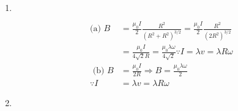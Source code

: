 \begin{enumerate}
\begin{answer}
\begin{figure}[H]
		\end{figure}
		\begin{align*}
		\because B&=\frac{\mu_{0} I}{4 \pi r}\left(\sin \theta_{2}-\sin \theta_{1}\right)\\
		\text{where }\theta_{1}&=-\frac{\phi}{2}\text{ and }\theta_{2}=\frac{\phi}{2}
	\intertext{	Magnetic field due to segment 1 and 3 is}
		B_{1}&=B_{3}=\frac{\mu_{0} I}{4 \pi(d / 2) \cos \frac{\phi}{2}}\left(\sin \frac{\phi}{2}+\sin \frac{\phi}{2}\right)
	\intertext{	Magnetic field due to segment 2 and 4 is}
		B_{2}&=B_{4}=\frac{\mu_{0} I}{4 \pi(d / 2) \sin \frac{\phi}{2}}\left(\cos \frac{\phi}{2}+\cos \frac{\phi}{2}\right)
	\intertext{	Hence, the magnitude of total magnetic field is}
		B&=B_{1}+B_{2}+B_{3}+B_{4}=\frac{2 \mu_{0} I}{4 \pi(d / 2) \sin \frac{\phi}{2}}\left(\cos \frac{\phi}{2}+\cos \frac{\phi}{2}\right)+\frac{2 \mu_{0} I}{4 \pi(d / 2) \cos \frac{\phi}{2}}\left(\sin \frac{\phi}{2}+\sin \frac{\phi}{2}\right) \\
		B&=\frac{2 \mu_{0} I}{4 \pi(d / 2) \sin \frac{\phi}{2} \cos \frac{\phi}{2}}\left[\left(\cos \frac{\phi}{2}+\cos \frac{\phi}{2}\right) \cos \frac{\phi}{2}+\sin \frac{\phi}{2}\left(\sin \frac{\phi}{2}+\sin \frac{\phi}{2}\right)\right] \\
		B&=\frac{4 \mu_{0} I}{4 \pi(d / 2)}\left[\frac{\cos \frac{\phi}{2}}{\sin \frac{\phi}{2}}+\frac{\sin \frac{\phi}{2}}{\cos \frac{\phi}{2}}\right]=\frac{\mu_{0} I}{\pi(d / 2)}\left[\frac{\cos ^{2} \frac{\phi}{2}+\sin ^{2} \frac{\phi}{2}}{\sin \frac{\phi}{2} \cos \frac{\phi}{2}}\right]=\frac{4 \mu_{0} I}{\pi d \sin \phi}
		\end{align*}
	\end{answer}
	\item $\left. \right. $
	\begin{answer}
		\begin{align*}
		\text{(a) }B&=\frac{\mu_{0} I}{2} \frac{R^{2}}{\left(R^{2}+R^{2}\right)^{3 / 2}}=\frac{\mu_{0} I}{2} \frac{R^{2}}{\left(2 R^{2}\right)^{3 / 2}}\\&=\frac{\mu_{0} I}{4 \sqrt{2} R}=\frac{\mu_{0} \lambda \omega}{4 \sqrt{2}} \because I=\lambda v=\lambda R \omega\\
	\text{	(b) }B&=\frac{\mu_{0} I}{2 R} \Rightarrow B=\frac{\mu_{0} \lambda \omega}{2}\\
		\because I&=\lambda v=\lambda R \omega
		\end{align*}
	\end{answer}
	\item $\left. \right. $
	\begin{answer}

\end{answer}
\end{enumerate}
